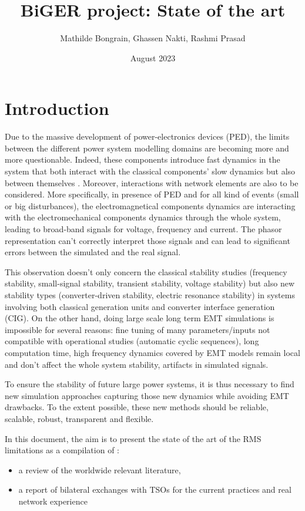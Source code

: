\documentclass{report}
\title{BiGER project: State of the art}
\author{Mathilde Bongrain, Ghassen Nakti, Rashmi Prasad}
\date{August 2023}
\begin{document}
\maketitle

\section*{Introduction}
Due to the massive development of power-electronics devices (PED), the limits between the different power system modelling domains are becoming more and more questionable. 
Indeed, these components introduce fast dynamics in the system that both interact with the classical components' slow dynamics but also between themselves \cite{b1}. 
Moreover, interactions with network elements are also to be considered. More specifically, in presence of PED and for all kind of events (small or big disturbances), the electromagnetical components dynamics are interacting with the electromechanical components dynamics through the whole system, leading to broad-band signals  for voltage, frequency and current. 
The phasor representation can’t correctly interpret those signals and can lead to significant errors between the simulated and the real signal.

This observation doesn’t only concern the classical stability studies (frequency stability, small-signal stability, transient stability, voltage stability) but also new stability types (converter-driven stability, electric resonance stability) in systems involving both classical generation units and converter interface generation (CIG).
On the other hand, doing large scale long term EMT simulations is impossible for several reasons: fine tuning of many parameters/inputs not compatible with operational studies (automatic cyclic sequences), long computation time, high frequency dynamics covered by EMT models remain local and don’t affect the whole system stability, artifacts in simulated signals.

To ensure the stability of future large power systems, it is thus necessary to find new simulation approaches capturing those new dynamics while avoiding EMT drawbacks. To the extent possible, these new methods should be reliable, scalable, robust, transparent and flexible.

In this document, the aim is to present the state of the art of the RMS limitations as a compilation of :
\begin{itemize}
    \item a review of the worldwide relevant literature, 
    \item a report of bilateral exchanges with TSOs for the current practices and real network experience
\end{itemize} 
\end{document}
